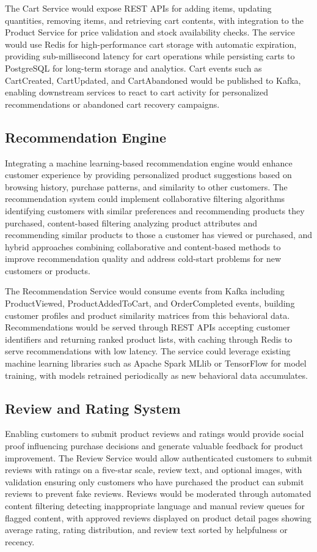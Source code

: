 The Cart Service would expose REST APIs for adding items, updating quantities, removing items, and retrieving cart contents, with integration to the Product Service for price validation and stock availability checks. The service would use Redis for high-performance cart storage with automatic expiration, providing sub-millisecond latency for cart operations while persisting carts to PostgreSQL for long-term storage and analytics. Cart events such as CartCreated, CartUpdated, and CartAbandoned would be published to Kafka, enabling downstream services to react to cart activity for personalized recommendations or abandoned cart recovery campaigns.

\subsection{Recommendation Engine}

Integrating a machine learning-based recommendation engine would enhance customer experience by providing personalized product suggestions based on browsing history, purchase patterns, and similarity to other customers. The recommendation system could implement collaborative filtering algorithms identifying customers with similar preferences and recommending products they purchased, content-based filtering analyzing product attributes and recommending similar products to those a customer has viewed or purchased, and hybrid approaches combining collaborative and content-based methods to improve recommendation quality and address cold-start problems for new customers or products.

The Recommendation Service would consume events from Kafka including ProductViewed, ProductAddedToCart, and OrderCompleted events, building customer profiles and product similarity matrices from this behavioral data. Recommendations would be served through REST APIs accepting customer identifiers and returning ranked product lists, with caching through Redis to serve recommendations with low latency. The service could leverage existing machine learning libraries such as Apache Spark MLlib or TensorFlow for model training, with models retrained periodically as new behavioral data accumulates.

\subsection{Review and Rating System}

Enabling customers to submit product reviews and ratings would provide social proof influencing purchase decisions and generate valuable feedback for product improvement. The Review Service would allow authenticated customers to submit reviews with ratings on a five-star scale, review text, and optional images, with validation ensuring only customers who have purchased the product can submit reviews to prevent fake reviews. Reviews would be moderated through automated content filtering detecting inappropriate language and manual review queues for flagged content, with approved reviews displayed on product detail pages showing average rating, rating distribution, and review text sorted by helpfulness or recency.

